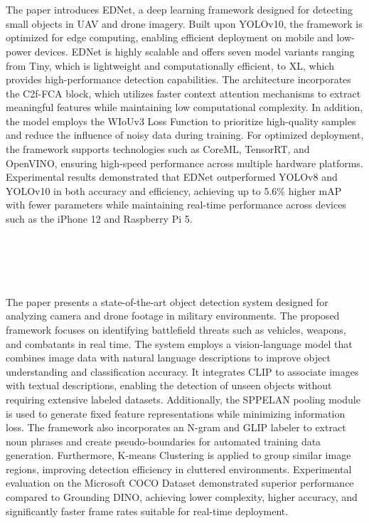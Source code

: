 \section[\LitTitleSeven]{\LitTitleSeven~\textbf{\cite{supplementary_paper_7}} \label{sec:supplementary_paper_7}}
The paper introduces EDNet, a deep learning framework designed for detecting small objects in UAV and drone imagery. Built upon YOLOv10, the framework is optimized for edge computing, enabling efficient deployment on mobile and low-power devices. EDNet is highly scalable and offers seven model variants ranging from Tiny, which is lightweight and computationally efficient, to XL, which provides high-performance detection capabilities. The architecture incorporates the C2f-FCA block, which utilizes faster context attention mechanisms to extract meaningful features while maintaining low computational complexity. In addition, the model employs the WIoUv3 Loss Function to prioritize high-quality samples and reduce the influence of noisy data during training. For optimized deployment, the framework supports technologies such as CoreML, TensorRT, and OpenVINO, ensuring high-speed performance across multiple hardware platforms. Experimental results demonstrated that EDNet outperformed YOLOv8 and YOLOv10 in both accuracy and efficiency, achieving up to 5.6\% higher mAP with fewer parameters while maintaining real-time performance across devices such as the iPhone 12 and Raspberry Pi 5.\label{end:supplementary_paper_7} \\

\section[\LitTitleEight]{\LitTitleEight~\textbf{\cite{supplementary_paper_8}} \label{sec:supplementary_paper_8}}
The paper presents a state-of-the-art object detection system designed for analyzing camera and drone footage in military environments. The proposed framework focuses on identifying battlefield threats such as vehicles, weapons, and combatants in real time. The system employs a vision-language model that combines image data with natural language descriptions to improve object understanding and classification accuracy. It integrates CLIP to associate images with textual descriptions, enabling the detection of unseen objects without requiring extensive labeled datasets. Additionally, the SPPELAN pooling module is used to generate fixed feature representations while minimizing information loss. The framework also incorporates an N-gram and GLIP labeler to extract noun phrases and create pseudo-boundaries for automated training data generation. Furthermore, K-means Clustering is applied to group similar image regions, improving detection efficiency in cluttered environments. Experimental evaluation on the Microsoft COCO Dataset demonstrated superior performance compared to Grounding DINO, achieving lower complexity, higher accuracy, and significantly faster frame rates suitable for real-time deployment.\label{end:supplementary_paper_8} \\

